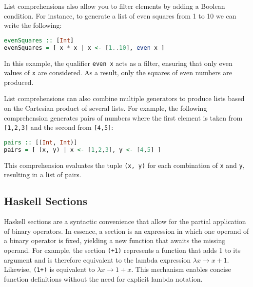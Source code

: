 List comprehensions also allow you to filter elements by adding a Boolean condition. For instance, to generate
a list of even squares from 1 to 10 we can write the following:
\begin{lstlisting}[style=haskellstyle, language=Haskell]
evenSquares :: [Int]
evenSquares = [ x * x | x <- [1..10], even x ]
\end{lstlisting}
In this example, the qualifier \texttt{even x} acts as a filter, ensuring that only even values of \texttt{x}
are considered. As a result, only the squares of even numbers are produced. 

List comprehensions can also combine multiple generators to produce lists based on the Cartesian product of
several lists. For example, the following comprehension generates pairs of numbers where the first element is
taken from \texttt{[1,2,3]} and the second from \texttt{[4,5]}: 
\begin{lstlisting}[style=haskellstyle, language=Haskell]
pairs :: [(Int, Int)]
pairs = [ (x, y) | x <- [1,2,3], y <- [4,5] ]
\end{lstlisting}
This comprehension evaluates the tuple \texttt{(x, y)} for each combination of \texttt{x} and \texttt{y}, resulting in a list of pairs.

\subsection{Haskell Sections}
Haskell sections are a syntactic convenience that allow for the partial application of binary
operators. In essence, a section is an expression in which one operand of a binary operator is
fixed, yielding a new function that awaits the missing operand. For example, the section
\texttt{(+1)} represents a function that adds 1 to its argument and is therefore equivalent to the lambda expression
$\lambda x \to x + 1$. Likewise, \texttt{(1+)} is equivalent to $\lambda x \to 1 + x$. This
mechanism enables concise function definitions without the need for explicit lambda notation. 

